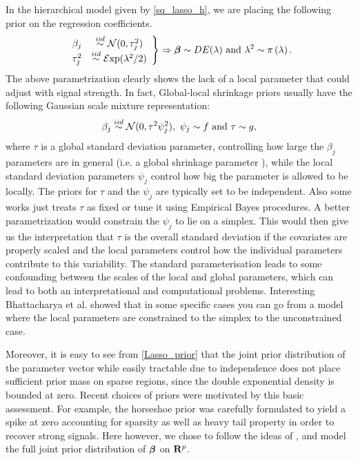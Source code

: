 \documentclass[chapters]{uamaththesis}
\begin{document}
In the hierarchical model given by \ref{sq_lasso_h}, we are placing the following prior on the regression coefficients. 
\begin{equation} \label{Lasso_prior}
\left.
\begin{array}{cc}
\beta_j & \stackrel{iid}{\sim} \mathcal{N}(0 , \tau_j^2) \\
\tau_j^2 & \stackrel{iid}{\sim} \mathcal{E}\mathrm{xp}(\lambda^2/2) 
\end{array} \right \} \Rightarrow
\boldsymbol{\beta} \sim DE(\lambda) \text{ and } \lambda^2 \sim \pi \left(\lambda \right). 
\end{equation}
The above parametrization clearly shows the lack of a local parameter that could adjust with signal strength. In fact, Global-local shrinkage priors usually have the following Gaussian scale mixture representation: \[ \beta_j \stackrel{iid}{\sim} \mathcal{N}(0 , \tau^2 \psi_j^2), \ \psi_j \sim f \mbox{ and} \ \tau \sim g, \] where $\tau$ is a global standard deviation parameter, controlling how large the $\beta_j$ parameters are in general (\rm{i.e.} a global shrinkage parameter ), while the local standard deviation parameters $\psi_j$ control how big the parameter is allowed to be locally.  The priors for $\tau$ and the $\psi_j$ are typically set to be independent.  Also some works just treats $\tau$ as fixed or tune it using Empirical Bayes procedures. A better parametrization  would constrain the $\psi_j$ to lie on a simplex.  This would then give us the interpretation that $\tau$ is the overall standard deviation if the covariates are properly scaled  and the local parameters control how the individual parameters contribute to this variability. The standard parameterisation leads to some confounding between the scales of the local and global parameters, which can lead to both an interpretational and computational problems.  Interesting Bhattacharya et al. showed that in some specific cases you can go from a model where the local parameters are constrained to the simplex to the unconstrained case.

  Moreover, it is easy to see from \eqref{Lasso_prior} that the joint prior distribution of the parameter vector while easily tractable due to independence does not place sufficient prior mass on sparse regions, since the double exponential density is bounded at zero. Recent choices of priors were motivated by this basic assessment. For example, the horseshoe prior was carefully formulated to yield a spike at zero accounting for sparsity as well as heavy tail property in order to recover strong signals. Here however, we chose to follow the ideas of \citep{bhattacharya2014dirichlet}, and model the full joint prior distribution of $\boldsymbol{\beta}$ on ${\bf R}^p$.
\end{document}
